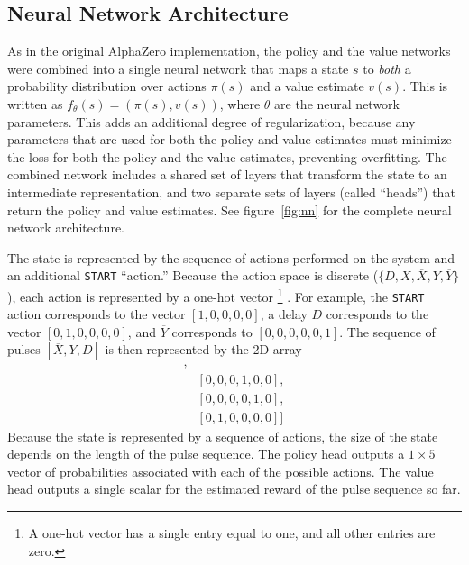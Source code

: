 
\subsection{Neural Network Architecture}

As in the original AlphaZero implementation, the policy and the value networks were combined into a single neural network that maps a state $s$ to \emph{both} a probability distribution over actions $\pi(s)$ and a value estimate $v(s)$. This is written as $f_\theta(s) = (\pi(s), v(s))$, where $\theta$ are the neural network parameters. This adds an additional degree of regularization, because any parameters that are used for both the policy and value estimates must minimize the loss for both the policy and the value estimates, preventing overfitting. The combined network includes a shared set of layers that transform the state to an intermediate representation, and two separate sets of layers (called ``heads'') that return the policy and value estimates. See figure~\ref{fig:nn} for the complete neural network architecture.

The state is represented by the sequence of actions performed on the system and an additional \texttt{START} ``action.''
Because the action space is discrete ($\{ D, X, \overline{X}, Y, \overline{Y} \}$), each action is represented by a one-hot vector%
\footnote{
A one-hot vector has a single entry equal to one, and all other entries are zero.
}%
. For example, the \texttt{START} action corresponds to the vector $[1,0,0,0,0]$, a delay $D$ corresponds to the vector $[0,1,0,0,0,0]$, and $\overline{Y}$ corresponds to $[0,0,0,0,0,1]$. The sequence of pulses $[\overline{X}, Y, D]$ is then represented by the 2D-array
\begin{align*}
    [&[1,0,0,0,0,0], \\
    &[0,0,0,1,0,0], \\
    &[0,0,0,0,1,0], \\
    &[0,1,0,0,0,0]]
\end{align*}
Because the state is represented by a sequence of actions, the size of the state depends on the length of the pulse sequence.
The policy head outputs a $1 \times 5$ vector of probabilities associated with each of the possible actions. The value head outputs a single scalar for the estimated reward of the pulse sequence so far.

